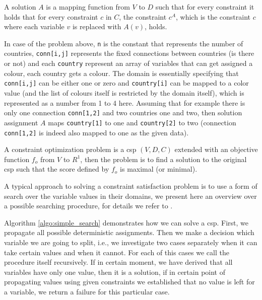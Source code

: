 A solution $A$ is a mapping function from $V$ to $D$ such that for every constraint it holds that for every constraint $c$ in $C$, the constraint $c^A$, which is the constraint $c$ where each variable $v$ is replaced with $A(v)$, holds.

\pubrev 
In case of the problem above,  \texttt{n} is the constant that represents the number of countries, \texttt{conn[i,j]} represents the fixed connections between countries (is there or not) and each \texttt{country} represent an array of variables that can get assigned a colour, each country gets a colour. The domain is essentially specifying that \texttt{conn[i,j]} can be either one or zero and \texttt{country[i]} can be mapped to a color value (and the list of colours itself is restricted by the domain itself), which is represented as a number from 1 to 4 here. Assuming that for example there is only one connection \texttt{conn[1,2]} and two countries one and two, then solution assignment $A$ maps \texttt{country[1]} to one and \texttt{country[2]} to two (connection \texttt{conn[1,2]} is indeed also mapped to one as the given data).
\pubrevend

A constraint optimization problem is a \acrshort{csp} $(V,D,C)$ extended with an objective function $f_o$ from $V$ to $R^1$, then the problem is to find a solution to the original \acrshort{csp} such that the score defined by $f_o$ is maximal (or minimal).

A typical approach to solving a constraint satisfaction problem is to use a form of search over the variable values in their domains, we present here an overview over a possible searching procedure, for details we refer to \textcite{tias_phd}.

Algorithm \ref{algo:simple_search} demonstrates how we can solve a \acrshort{csp}. First, we propagate all possible deterministic assignments. Then we make a decision which variable we are going to split, i.e., we investigate two cases separately when it can take certain values and when it cannot. For each of this cases we call the procedure itself recursively. If in certain moment, we have derived that all variables have only one value, then it is a solution, if in certain point of propagating values using given constraints we established that no value is left for a variable, we return a failure for this particular case.

